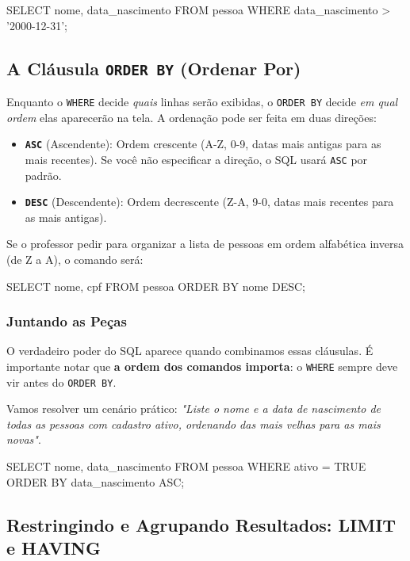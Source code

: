 \documentclass[12pt,a4paper,openright]{book}
\begin{document}
\begin{sqlcode}
SELECT nome, data_nascimento 
FROM pessoa 
WHERE data_nascimento > '2000-12-31';
\end{sqlcode}

\subsection{A Cláusula \texttt{ORDER BY} (Ordenar Por)}

Enquanto o \texttt{WHERE} decide \textit{quais} linhas serão exibidas, o \texttt{ORDER BY} decide \textit{em qual ordem} elas aparecerão na tela. A ordenação pode ser feita em duas direções:

\begin{itemize}
    \item \textbf{\texttt{ASC}} (Ascendente): Ordem crescente (A-Z, 0-9, datas mais antigas para as mais recentes). Se você não especificar a direção, o SQL usará \texttt{ASC} por padrão.
    \item \textbf{\texttt{DESC}} (Descendente): Ordem decrescente (Z-A, 9-0, datas mais recentes para as mais antigas).
\end{itemize}
Se o professor pedir para organizar a lista de pessoas em ordem alfabética inversa (de Z a A), o comando será:
\begin{sqlcode}
SELECT nome, cpf 
FROM pessoa 
ORDER BY nome DESC;
\end{sqlcode}

\subsubsection{Juntando as Peças}

O verdadeiro poder do SQL aparece quando combinamos essas cláusulas. É importante notar que \textbf{a ordem dos comandos importa}: o \texttt{WHERE} sempre deve vir antes do \texttt{ORDER BY}.

Vamos resolver um cenário prático: \textit{"Liste o nome e a data de nascimento de todas as pessoas com cadastro ativo, ordenando das mais velhas para as mais novas"}.

\begin{sqlcode}
SELECT nome, data_nascimento
FROM pessoa
WHERE ativo = TRUE
ORDER BY data_nascimento ASC;
\end{sqlcode}


\subsection{Restringindo e Agrupando Resultados: LIMIT e HAVING}
\end{document}
